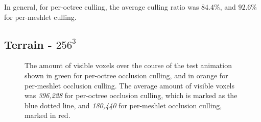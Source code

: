 \noindent
In general, for per-octree culling, the average culling ratio was $84.4\%$, and $92.6\%$ for per-meshlet culling. 



\subsection*{Terrain - $256^3$}


\begin{figure}[h]              %
    \begin{center}
      \caption{The amount of visible voxels over the course of the test animation shown in green for 
      per-octree occlusion culling, and in orange for per-meshlet occlusion culling. 
      The average amount of visible voxels was \emph{396,228} for per-octree occlusion culling, which is 
      marked as the blue dotted line, and \emph{180,440} for per-meshlet occlusion culling, marked in red.}
      \label{plt:terrain-256-culling-res-voxels}
    \end{center}
  \end{figure}


